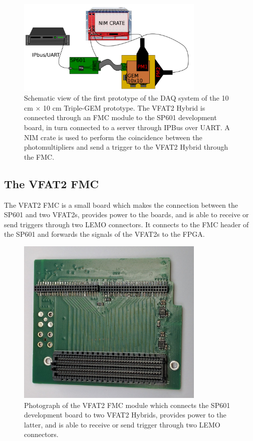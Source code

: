     \begin{figure}[h!]
      \centering
      \includegraphics[width=0.8\textwidth]{img/III-1-arch/sys_1.png}
      \caption{Schematic view of the first prototype of the DAQ system of the 10 cm $ \times $ 10 cm Triple-GEM prototype. The VFAT2 Hybrid is connected through an FMC module to the SP601 development board, in turn connected to a server through IPBus over UART. A NIM crate is used to perform the coincidence between the photomultipliers and send a trigger to the VFAT2 Hybrid through the FMC.}
      \label{fig:III-1-sys-1}
    \end{figure}

    \subsection{The VFAT2 FMC}

      The VFAT2 FMC is a small board which makes the connection between the SP601 and two VFAT2s, provides power to the boards, and is able to receive or send triggers through two LEMO connectors. It connects to the FMC header of the SP601 and forwards the signals of the VFAT2s to the FPGA.

      \begin{figure}[h!]
        \centering
        \includegraphics[width=0.8\textwidth]{img/III-1-arch/fmc.jpg}
        \caption{Photograph of the VFAT2 FMC module which connects the SP601 development board to two VFAT2 Hybrids, provides power to the latter, and is able to receive or send trigger through two LEMO connectors.}
        \label{fig:III-1-fmc}
      \end{figure}

